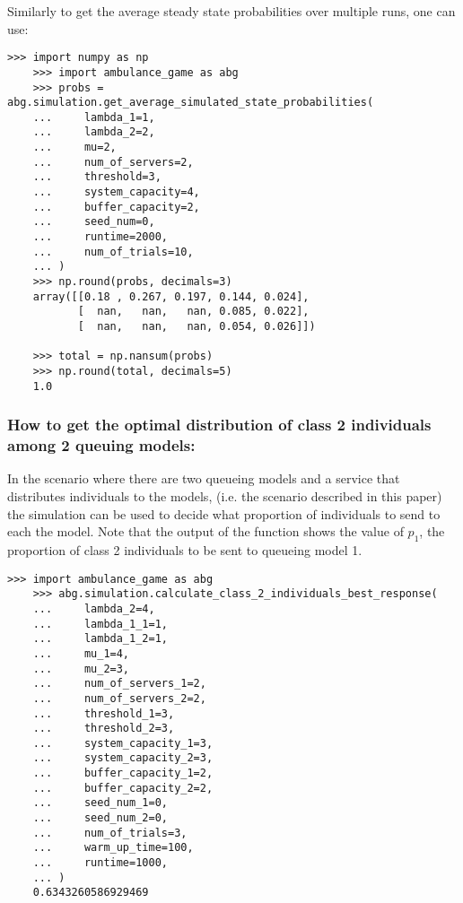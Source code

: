 Similarly to get the average steady state probabilities over multiple runs,
one can use:

\begin{lstlisting}[style=pystyle]
    >>> import numpy as np
    >>> import ambulance_game as abg
    >>> probs = abg.simulation.get_average_simulated_state_probabilities(
    ...     lambda_1=1,
    ...     lambda_2=2,
    ...     mu=2,
    ...     num_of_servers=2,
    ...     threshold=3,
    ...     system_capacity=4,
    ...     buffer_capacity=2,
    ...     seed_num=0,
    ...     runtime=2000,
    ...     num_of_trials=10,
    ... )
    >>> np.round(probs, decimals=3)
    array([[0.18 , 0.267, 0.197, 0.144, 0.024],
           [  nan,   nan,   nan, 0.085, 0.022],
           [  nan,   nan,   nan, 0.054, 0.026]])
    
    >>> total = np.nansum(probs)
    >>> np.round(total, decimals=5)
    1.0

\end{lstlisting}


\subsubsection{How to get the optimal distribution of class 2 individuals among 2 
queuing models:}

In the scenario where there are two queueing models and a service that 
distributes individuals to the models, (i.e. the scenario described in this 
paper) the simulation can be used to decide what proportion of individuals 
to send to each the model.
Note that the output of the function shows the value of \(p_1\), the proportion
of class 2 individuals to be sent to queueing model 1. 

\begin{lstlisting}[style=pystyle]
    >>> import ambulance_game as abg
    >>> abg.simulation.calculate_class_2_individuals_best_response(
    ...     lambda_2=4,
    ...     lambda_1_1=1,
    ...     lambda_1_2=1,
    ...     mu_1=4,
    ...     mu_2=3,
    ...     num_of_servers_1=2,
    ...     num_of_servers_2=2,
    ...     threshold_1=3,
    ...     threshold_2=3,
    ...     system_capacity_1=3,
    ...     system_capacity_2=3,
    ...     buffer_capacity_1=2,
    ...     buffer_capacity_2=2,
    ...     seed_num_1=0,
    ...     seed_num_2=0,
    ...     num_of_trials=3,
    ...     warm_up_time=100,
    ...     runtime=1000,
    ... )
    0.6343260586929469

\end{lstlisting}


